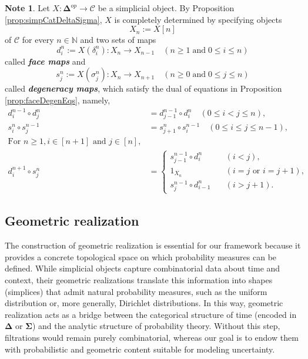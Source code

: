 \documentclass[12pt, a4paper]{amsart}
\theoremstyle{plain}
\theoremstyle{definition}
\newtheorem{Note}[thm]{Note}
\numberwithin{figure}{section}
\numberwithin{table}{section}
\newcommand{\newword}[1]{\textbf{\textit{#1}}}
\numberwithin{equation}{section}
\newcommand{\bDelta}{\mathbf{\Delta}}
\newcommand{\bSigma}{\mathbf{\Sigma}}
\begin{document}
\begin{Note}
\label{Note:simpObj}
Let
$
X
	:
\bDelta^{op} \to \mathcal{C}
$
be a simplicial object.
%
By Proposition \ref{prop:simpCatDeltaSigma},
$X$ is completely determined by specifying objects
\begin{equation}
\label{eq:Xn}
X_n := X[n]
\end{equation}
of $\mathcal{C}$ for every $n \in \mathbb{N}$
and
two sets of maps
\begin{equation}
\label{eq:faceMaps}
d^n_i := X(\delta^n_i)
	:
X_n \to X_{n-1}
	\quad
(n \ge 1 \; \textrm{and} \; 0 \le i \le n)
\end{equation}
called
\newword{face maps}
and
\begin{equation}
\label{eq:degeMaps}
s^n_j := X(\sigma^n_j)
	:
X_n \to X_{n+1}
	\quad
(n \ge 0 \; \textrm{and} \; 0 \le j \le n)
\end{equation}
called
\newword{degeneracy maps},
which satisfy the dual of 
equations in
Proposition \ref{prop:faceDegenEqs},
namely,
\begin{align}
\label{eq:SOdeltaDelta}
d^{n-1}_i
	\circ
d^n_j
		&=
d^{n-1}_{j-1}
	\circ
d^n_i
		\quad
(0 \le i < j \le n),
		\\
\label{eq:SOsigmaSigma}
s^{n}_i
	\circ
s^{n-1}_j
		&=
s^{n}_{j+1}
	\circ
s^{n-1}_i
		\quad
(0 \le i \le j \le n-1),
		\\
		\nonumber
\textrm{For }
n \ge 1,
i \in [n+1]
\textrm{ and }
j \in [n],
		\\
\label{eq:SOsigmaDelta}
d^{n+1}_i
	\circ
s^n_j
		&=
\begin{cases}
s^{n-1}_{j-1}
	\circ
d^{n}_i
		&\quad
(i < j),
			\\
1_{X_n}
		&\quad
(i = j \textrm{ or } i = j+1),
			\\
s^{n-1}_{j}
	\circ
d^{n}_{i-1}
		&\quad
(i > j+1) .
\end{cases}
\end{align}

\end{Note}



\subsection{Geometric realization}
\label{sec:geomRealization}

The construction of geometric realization is essential for our framework 
because it provides a concrete topological space on which probability measures can be defined. 
While simplicial objects capture combinatorial data about time and context, 
their geometric realizations translate this information into shapes (simplices) 
that admit natural probability measures, 
such as the uniform distribution or, more generally, Dirichlet distributions. 
In this way, 
geometric realization acts as a bridge between the categorical structure of time (encoded in $\bDelta$ or $\bSigma$) 
and the analytic structure of probability theory. 
Without this step, filtrations would remain purely combinatorial, 
whereas our goal is to endow them with probabilistic and geometric content suitable for modeling uncertainty. 
\end{document}
